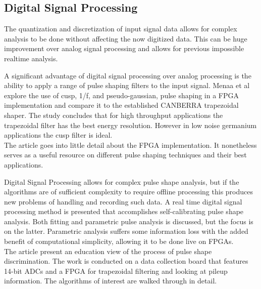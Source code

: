 \documentclass[12pt]{article}
\begin{document}
\begin{doublespacing}
\pagebreak
\section{Digital Signal Processing}   %
The quantization and discretization of input signal data allows for complex analysis to be done without affecting the now digitized data. This can be huge improvement over analog signal processing and allows for previous impossible realtime analysis.
\\[20pt]


{\large\textbf{\cite{Menaa2011512}}}

A significant advantage of digital signal processing over analog processing is the ability to apply a range of pulse shaping filters to the input signal. Menaa et al explore the use of cusp, 1/f, and pseudo-gaussian, pulse shaping in a FPGA implementation and compare it to the established CANBERRA trapezoidal shaper. The study concludes that for high throughput applications the trapezoidal filter has the best energy resolution. However in low noise germanium applications the cusp filter is ideal.
\\
The article goes into little detail about the FPGA implementation. It nonetheless serves as a useful resource on different pulse shaping techniques and their best applications.
\\[20pt]


{\large\textbf{\cite{Suarez2008276}}}

Digital Signal Processing allows for complex pulse shape analysis, but if the algorithms are of sufficient complexity to require offline processing this produces new problems of handling and recording such data. A real time digital signal processing method is presented that accomplishes self-calibrating pulse shape analysis. Both fitting and parametric pulse analysis is discussed, but the focus is on the latter. Parametric analysis suffers some information loss with the added benefit of computational simplicity, allowing it to be done live on FPGAs.
\\
The article present an education view of the process of pulse shape discrimination. The work is conducted on a data collection board that features 14-bit ADCs and a FPGA for trapezoidal filtering and looking at pileup information. The algorithms of interest are walked through in detail.
\\[20pt]



\end{doublespacing}
\end{document}
